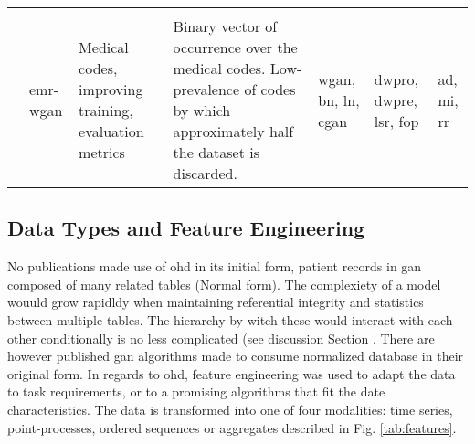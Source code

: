 \begin{sidewaystable}[htbp]
\begin{tabularx}{\textwidth}{@{}p{3cm}XXXXXX@{}}
            \cite{Goncalves2020}
            &
            & 
            & 
            & 
            & 
            &\\
            
            \cite{Zhang2020}
            &\gls{emr-wgan}
            & Medical codes, improving training, evaluation metrics
            & Binary vector of occurrence over the medical codes. Low-prevalence of codes by which approximately half the dataset is discarded.
            & \gls{wgan}, \gls{bn}, \gls{ln}, \gls{cgan}
            & \gls{dwpro}, \gls{dwpre}, \gls{lsr}, \gls{fop}
            &\gls{ad}, \gls{mi}, \gls{rr}\\
            
            \bottomrule
        \end{tabularx}
    \end{sidewaystable}

    \subsection{Data Types and Feature Engineering}

    No publications made use of \gls{ohd} in its initial form, patient records in \gls{gan} composed of many related tables (Normal form). The complexiety of a model wouuld grow rapidldy when maintaining referential integrity and statistics between multiple tables. The hierarchy by witch these would interact with each other conditionally is no less complicated (see discussion Section . There are however published \gls{gan} algorithms made to consume normalized database in their original form. \todo In regards to \gls{ohd}, feature engineering was used to adapt the data to task requirements, or to a promising algorithms that fit the date characteristics. The data is transformed into one of four modalities: time series, point-processes, ordered sequences or aggregates described in Fig. \ref{tab:features}.
    
